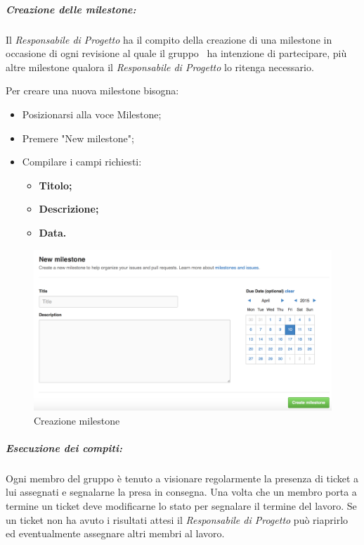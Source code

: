 		\newpage
		\subparagraph{Creazione delle milestone:}
		
		Il \textit{Responsabile di Progetto} ha il compito della creazione di una \gls{milestone} in occasione di ogni revisione al quale il gruppo \GRUPPO\ ha intenzione di partecipare, più altre \gls{milestone} qualora il \textit{Responsabile di Progetto} lo ritenga necessario.
		
		Per creare una nuova \gls{milestone} bisogna:
		
		\begin{itemize}
			\item Posizionarsi alla voce \gls{Milestone};
			\item Premere "New \gls{milestone}";
			\item Compilare i campi richiesti:
			\begin{itemize}
				\item \textbf{Titolo;}
				\item \textbf{Descrizione;}
				\item \textbf{Data.}
			\end{itemize}
		\end{itemize}
		\begin{figure}[h]
			\centering
			\includegraphics[width=1\linewidth]{img/milestone}
			\caption[Creazione milestone]{Creazione milestone}
			\label{fig:milestone}
		\end{figure}
		
		\subparagraph{Esecuzione dei compiti:}
		
		Ogni membro del gruppo è tenuto a visionare regolarmente la presenza di \gls{ticket} a lui assegnati e segnalarne la presa in consegna.
		Una volta che un membro porta a termine un \gls{ticket} deve modificarne lo stato per segnalare il termine del lavoro.
		Se un \gls{ticket} non ha avuto i risultati attesi il \textit{Responsabile di Progetto} può riaprirlo ed eventualmente assegnare altri membri al lavoro.
		
